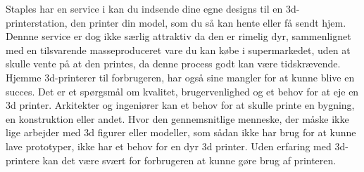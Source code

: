Staples har en service i kan du indsende dine egne designs til en 3d-printerstation, den printer din model, som du så kan hente eller få sendt hjem. Dennne service er dog ikke særlig attraktiv da den er rimelig dyr, sammenlignet med en tilsvarende masseproduceret vare du kan købe i supermarkedet, uden at skulle vente på at den printes, da denne process godt kan være tidskrævende.
Hjemme 3d-printerer til forbrugeren, har også sine mangler for at kunne blive en succes. Det er et spørgsmål om kvalitet, brugervenlighed og et behov for at eje en 3d printer. Arkitekter og ingeniører kan et behov for at skulle printe en bygning, en konstruktion eller andet. Hvor den gennemsnitlige menneske, der måske ikke lige arbejder med 3d figurer eller modeller, som sådan ikke har brug for at kunne lave prototyper, ikke har et behov for en dyr 3d printer. Uden erfaring med 3d-printere kan det være svært for forbrugeren at kunne gøre brug af printeren. \cite{_3d_2013}
